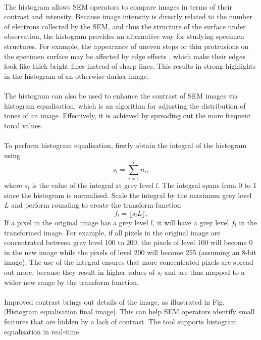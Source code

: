\documentclass[12pt, twocolumn]{report}
\begin{document}
\paragraph{}
The histogram allows SEM operators to compare images in terms of their contrast and intensity. Because image intensity is directly related to the number of electrons collected by the SEM, and thus the structure of the surface under observation, the histogram provides an alternative way for studying specimen structures. For example, the appearance of uneven steps or thin protrusions on the specimen surface may be affected by edge effects \cite{SEM A to Z}, which make their edges look like thick bright lines instead of sharp lines. This results in strong highlights in the histogram of an otherwise darker image.

\paragraph{}
The histogram can also be used to enhance the contrast of SEM images via histogram equalisation, which is an algorithm for adjusting the distribution of tones of an image. Effectively, it is achieved by spreading out the more frequent tonal values. 

\paragraph{}
To perform histogram equalisation, firstly obtain the integral of the histogram using
\[s_l = \sum_{i=1}^{l} n_i,\]
where $s_l$ is the value of the integral at grey level $l$. The integral spans from 0 to 1 since the histogram is normalised. Scale the integral by the maximum grey level $L$ and perform rounding to create the transform function
\begin{equation}
    f_l = \lfloor s_lL \rfloor,
    \label{Histogram equalisation transform function}
\end{equation}
If a pixel in the original image has a grey level $l$, it will have a grey level $f_l$ in the transformed image. For example, if all pixels in the original image are concentrated between grey level 100 to 200, the pixels of level 100 will become 0 in the new image while the pixels of level 200 will become 255 (assuming an 8-bit image). The use of the integral ensures that more concentrated pixels are spread out more, because they result in higher values of $s_l$ and are thus mapped to a wider new range by the transform function.

\paragraph{}
Improved contrast brings out details of the image, as illustrated in Fig. \ref{Histogram equalisation final image}. This can help SEM operators identify small features that are hidden by a lack of contrast. The tool supports histogram equalisation in real-time.
\end{document}
